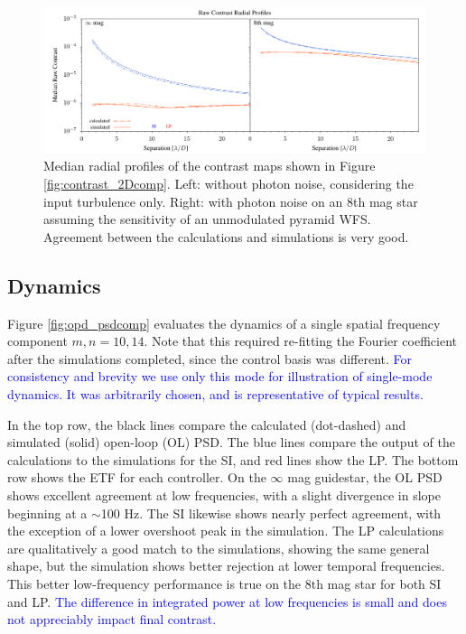 \documentclass[10pt,preprint]{aastex631}
\newcommand{\jrmadd}[1]{\textcolor{blue}{#1}}
\begin{document}
\begin{figure}
\hspace{-0.3in}
\includegraphics[width=6.5in]{contrastRP.pdf}
\caption{Median radial profiles of the contrast maps shown in Figure \ref{fig:contrast_2Dcomp}.  Left: without photon noise, considering the input turbulence only.  Right: with photon noise on an 8th mag star assuming the sensitivity of an unmodulated pyramid WFS. Agreement between the calculations and simulations is very good.\label{fig:contrast_radprof}}
\end{figure}

\subsection{Dynamics}
Figure \ref{fig:opd_psdcomp} evaluates the dynamics of a single spatial frequency component  $m,n = 10,14$.  Note that this required re-fitting the Fourier coefficient after the simulations completed, since the control basis was different.  \jrmadd{For consistency and brevity we use only this mode for illustration of single-mode dynamics.  It was arbitrarily chosen, and is representative of typical results.}

In the top row, the black lines compare the calculated (dot-dashed) and simulated (solid) open-loop (OL) PSD.  The blue lines compare the output of the calculations to the simulations for the SI, and red lines show the LP.  The bottom row shows the ETF for each controller.  On the $\infty$ mag guidestar, the OL PSD shows excellent agreement at low frequencies, with a slight divergence in slope beginning at a $\sim$100 Hz. The SI likewise shows nearly perfect agreement, with the exception of a lower overshoot peak in the simulation.  The LP calculations are qualitatively a good match to the simulations, showing the same general shape, but the simulation shows better rejection at lower temporal frequencies.  This better low-frequency performance is true on the 8th mag star for both SI and LP.  \jrmadd{The difference in integrated power at low frequencies is small and does not appreciably impact final contrast.}  
\end{document}

